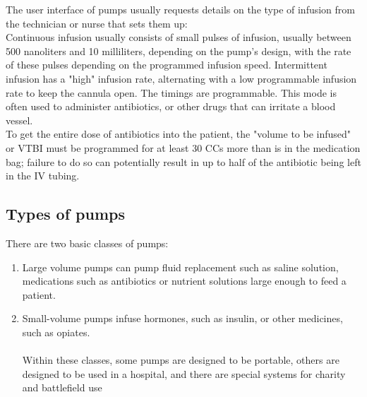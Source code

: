\documentclass[12pt]{article}
\begin{document}
The user interface of pumps usually requests details on the type of infusion from the technician or nurse that sets them up:\\

Continuous infusion usually consists of small pulses of infusion, usually between 500 nanoliters and 10 milliliters, depending on the pump's design, with the rate of these pulses depending on the programmed infusion speed.
Intermittent infusion has a "high" infusion rate, alternating with a low programmable infusion rate to keep the cannula open. The timings are programmable. This mode is often used to administer antibiotics, or other drugs that can irritate a blood vessel.\\

To get the entire dose of antibiotics into the patient, the "volume to be infused" or VTBI must be programmed for at least 30 CCs more than is in the medication bag; failure to do so can potentially result in up to half of the antibiotic being left in the IV tubing.




\subsection{Types of pumps}

There are two basic classes of pumps:
\begin{enumerate}


\item Large volume pumps can pump fluid replacement such as saline solution, medications such as antibiotics or nutrient solutions large enough to feed a patient.
\item  Small-volume pumps infuse hormones, such as insulin, or other medicines, such as opiates.\\\\

Within these classes, some pumps are designed to be portable, others are designed to be used in a hospital, and there are special systems for charity and battlefield use


\end{enumerate}
\end{document}
